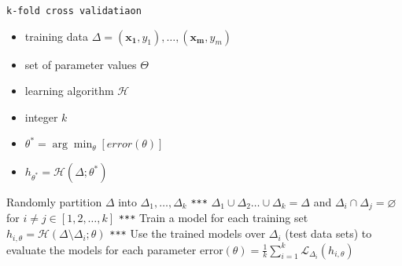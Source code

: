 \documentclass{article}
\newcommand{\argmin}{\arg\!\min}
\begin{document}
{\small
\begin{center}
\begin{algorithmic}[1]\label{alg:crossValidation}
 \texttt{k-fold cross validatiaon}
 \begin{itemize}
\item \textsf{training data} $\Delta = (\mathbf{x_1},y_1),\ldots,(\mathbf{x_m},y_m)$
\item  set of parameter values $\Theta$
\item  learning algorithm $\mathcal{H}$
\item  integer $k$
\end{itemize}
\begin{itemize}
\item $\theta^* =\argmin_\theta [error(\theta)]$
\item $h_{\theta^*} = \mathcal{H}(\Delta;\theta^*)$ 
\end{itemize}
\State Randomly partition $\Delta$ into $\Delta_1,\ldots,\Delta_k$
\State  \texttt{***} $\Delta_1\cup\Delta_2\ldots \cup\Delta_k = \Delta$ and $\Delta_i \cap \Delta_j = \varnothing$ for $i \neq j \in [1,2,\ldots,k]$
\For{$\theta \in \Theta$}
\State  \texttt{***}  \textsf{Train a model for each training set}
\State $h_{i,\theta} = \mathcal{H}(\Delta \setminus \Delta_i;\theta)$
\EndFor
\State  \texttt{***}  \textsf{Use the trained models over $\Delta_i$ (test data sets) to evaluate the models for each parameter}
\State error$(\theta)= \frac{1}{k} \sum_{i=1}^{k} \mathcal{L}_{\Delta_i} (h_{i,\theta})$
\EndFor
\end{algorithmic}
\end{center}}

\pagebreak
 
\end{document}
